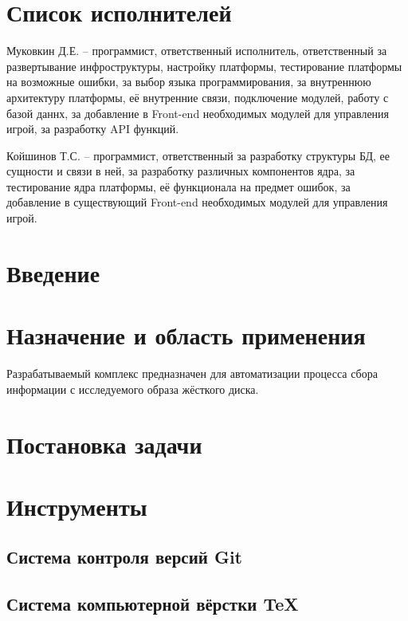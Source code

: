 


 
 
 
 \newpage
 \section*{Список исполнителей}
 
Муковкин Д.Е. -- программист, ответственный исполнитель, ответственный за развертывание инфроструктуры, настройку платформы, тестирование платформы на возможные ошибки, за выбор языка программирования, за внутреннюю архитектуру платформы, её внутренние связи, подключение модулей, работу с базой даннх, за добавление в Front-end необходимых модулей для управления игрой, за разработку API функций.

Койшинов Т.С. -- программист, ответственный за разработку структуры БД, ее сущности и связи в ней, за разработку различных компонентов ядра, за тестирование ядра платформы, её функционала на предмет ошибок, за добавление в существующий Front-end необходимых модулей для управления игрой.
 
 \newpage
 \tableofcontents

 \newpage
 \section*{Введение}
 

 \section{Назначение и область применения}
Разрабатываемый комплекс предназначен для автоматизации процесса сбора информации с исследуемого образа жёсткого диска.
\section{Постановка задачи}
\setcounter{figure}{0}

\section{Инструменты}
\setcounter{figure}{0}
\subsection{Система контроля версий Git}

\subsection{Система компьютерной вёрстки \TeX}

